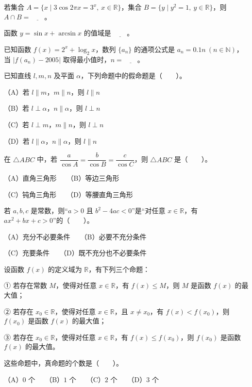 \begin{question}
若集合 $A=\{x\mid 3\cos 2\pi x=3^x,\ x\in\mathbb R\}$，集合 $B=\{y\mid y^2=1,\ y\in\mathbb R\}$，则 $A\cap B=\underline{\qquad}$。

\end{question}
\begin{question}
函数 $y=\sin x+\arcsin x$ 的值域是 $\underline{\qquad}$。

\end{question}
\begin{question}
已知函数 $f(x)=2^x+\log_2 x$，数列 $\{a_n\}$ 的通项公式是 $a_n=0.1n\ (n\in\mathbb N)$，当 $\mbox{$\lvert f(a_n)-2005\rvert$}$ 取得最小值时，$n=\underline{\qquad}$。

\end{question}

\begin{question}
已知直线 $l,m,n$ 及平面 $\alpha$，下列命题中的假命题是\mbox{（　　）}。

（A）若 $l\parallel m$，$m\parallel n$，则 $l\parallel n$

（B）若 $l\perp\alpha$，$n\parallel\alpha$，则 $l\perp n$

（C）若 $l\perp m$，$m\parallel n$，则 $l\perp n$

（D）若 $l\parallel\alpha$，$n\parallel\alpha$，则 $l\parallel n$

\end{question}
\begin{question}
在 $\triangle ABC$ 中，若 $\dfrac{a}{\cos A}=\dfrac{b}{\cos B}=\dfrac{c}{\cos C}$，则 $\triangle ABC$ 是\mbox{（　　）}。

（A）直角三角形　　（B）等边三角形

（C）钝角三角形　　（D）等腰直角三角形

\end{question}
\begin{question}
若 $a,b,c$ 是常数，则“$a>0$ 且 $b^2-4ac<0$”是“对任意 $x\in\mathbb R$，有 $ax^2+bx+c>0$”的\mbox{（　　）}。

（A）充分不必要条件　　（B）必要不充分条件

（C）充要条件　　（D）既不充分也不必要条件

\end{question}
\begin{question}
设函数 $f(x)$ 的定义域为 $\mathbb R$，有下列三个命题：

① 若存在常数 $M$，使得对任意 $x\in\mathbb R$，有 $f(x)\le M$，则 $M$ 是函数 $f(x)$ 的最大值；

② 若存在 $x_0\in\mathbb R$，使得对任意 $x\in\mathbb R$，且 $x\ne x_0$，有 $f(x)<f(x_0)$，则 $f(x_0)$ 是函数 $f(x)$ 的最大值；

 ③ 若存在 $x_0\in\mathbb R$，使得对任意 $x\in\mathbb R$，有 $f(x)\le f(x_0)$，则 $f(x_0)$ 是函数 $f(x)$ 的最大值。

这些命题中，真命题的个数是\mbox{（　　）}。

（A）$0$ 个　　（B）$1$ 个　　（C）$2$ 个　　（D）$3$ 个

\end{question}

